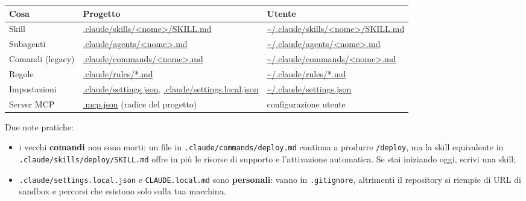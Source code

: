 \documentclass[
  italian,
  10pt,
]{book}
\newcounter{none} %
\providecommand{\tightlist}{%
  \setlength{\itemsep}{0pt}\setlength{\parskip}{0pt}}
\begin{document}
{\def\LTcaptype{none} %
\begin{longtable}[]{@{}
  >{\raggedright\arraybackslash}p{}
  >{\raggedright\arraybackslash}p{}
  >{\raggedright\arraybackslash}p{}@{}}
\toprule\noalign{}
\begin{minipage}[b]{\linewidth}\raggedright
Cosa
\end{minipage} & \begin{minipage}[b]{\linewidth}\raggedright
Progetto
\end{minipage} & \begin{minipage}[b]{\linewidth}\raggedright
Utente
\end{minipage} \\
\midrule\noalign{}
\endhead
\bottomrule\noalign{}
\endlastfoot
Skill & \url{.claude/skills/<nome>/SKILL.md} &
\url{~/.claude/skills/<nome>/SKILL.md} \\
Subagenti & \url{.claude/agents/<nome>.md} &
\url{~/.claude/agents/<nome>.md} \\
Comandi (legacy) & \url{.claude/commands/<nome>.md} &
\url{~/.claude/commands/<nome>.md} \\
Regole & \url{.claude/rules/*.md} & \url{~/.claude/rules/*.md} \\
Impostazioni & \url{.claude/settings.json},
\url{.claude/settings.local.json} & \url{~/.claude/settings.json} \\
Server MCP & \url{.mcp.json} (radice del progetto) & configurazione
utente \\
\end{longtable}
}

\normalsize

Due note pratiche:

\begin{itemize}
\tightlist
\item
  i vecchi \textbf{comandi} non sono morti: un file in
  \texttt{.claude/commands/deploy.md} continua a produrre
  \texttt{/deploy}, ma la skill equivalente in
  \texttt{.claude/skills/deploy/SKILL.md} offre in più le risorse di
  supporto e l'attivazione automatica. Se stai iniziando oggi, scrivi
  una skill;
\item
  \texttt{.claude/settings.local.json} e \texttt{CLAUDE.local.md} sono
  \textbf{personali}: vanno in \texttt{.gitignore}, altrimenti il
  repository si riempie di URL di sandbox e percorsi che esistono solo
  sulla tua macchina.
\end{itemize}
\end{document}
